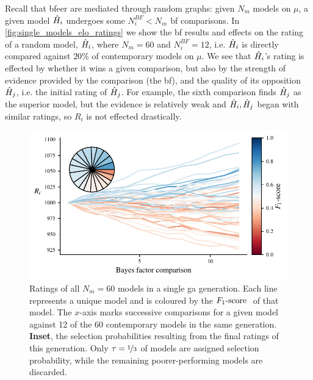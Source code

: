 Recall that \gls{bfeer} are mediated through random graphs: 
    given $N_m$ models on $\mu$, a given model $\hat{H}_i$ undergoes some 
    $N_i^{BF} < N_m$ \gls{bf} comparisons. 
In \cref{fig:single_models_elo_ratings} we show the \gls{bf} results 
    and effects on the rating of a random model, $\hat{H}_i$, where $N_m=60$ and $N_i^{BF}=12$,
    i.e. $\hat{H}_i$ is directly compared against $20\%$ of contemporary models on $\mu$. 
We see that $\hat{H}_i$'s rating is effected by whether it wins a given comparison, 
    but also by the strength of evidence provided by the comparison (the \gls{bf}), 
    and the quality of its opposition $\hat{H}_j$, i.e. the initial rating of $\hat{H}_j$.
For example, the sixth comparison finds $\hat{H}_j$ as the superior model, 
    but the evidence is relatively weak and $\hat{H}_i, \hat{H}_j$ began with similar ratings, 
    so $R_i$ is not effected drastically. 


\par 
\begin{figure}
    \begin{center}
        \includegraphics{theoretical_study/figures/single_generation_all_ratings.pdf}
    \end{center}
    \caption[Ratings of all models in a single genetic algorithm generation]{
        Ratings of all $N_m=60$ models in a single \acrlong{ga} generation.
        Each line represents a unique model and is coloured by the $ F_{1}\text{-score}  \ $ of that model. 
        The $x$-axis marks successive comparisons for a given model against 12 of the 60 
            contemporary models in the same generation. 
        \textbf{Inset}, the selection probabilities resulting from the final ratings of this generation. 
        Only $\tau=\nicefrac{1}{3}$ of models are assigned selection probability, 
            while the remaining poorer-performing models are discarded. 
        \figtableref
    }
    \label{fig:single_generation_all_ratings}
\end{figure}

